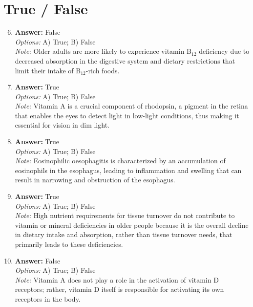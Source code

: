 \documentclass[12pt]{article}
\begin{document}
\section*{True / False}
\begin{enumerate}[label=\arabic*.]
\setcounter{enumi}{5}
\item \textbf{Answer:} False
\\ \textit{Options:} A) True; B) False
\\ \textit{Note:} Older adults are more likely to experience vitamin B$_{12}$ deficiency due to decreased absorption in the digestive system and dietary restrictions that limit their intake of B$_{12}$-rich foods.
\item \textbf{Answer:} True
\\ \textit{Options:} A) True; B) False
\\ \textit{Note:} Vitamin A is a crucial component of rhodopsin, a pigment in the retina that enables the eyes to detect light in low-light conditions, thus making it essential for vision in dim light.
\item \textbf{Answer:} True
\\ \textit{Options:} A) True; B) False
\\ \textit{Note:} Eosinophilic oesophagitis is characterized by an accumulation of eosinophils in the esophagus, leading to inflammation and swelling that can result in narrowing and obstruction of the esophagus.
\item \textbf{Answer:} True
\\ \textit{Options:} A) True; B) False
\\ \textit{Note:} High nutrient requirements for tissue turnover do not contribute to vitamin or mineral deficiencies in older people because it is the overall decline in dietary intake and absorption, rather than tissue turnover needs, that primarily leads to these deficiencies.
\item \textbf{Answer:} False
\\ \textit{Options:} A) True; B) False
\\ \textit{Note:} Vitamin A does not play a role in the activation of vitamin D receptors; rather, vitamin D itself is responsible for activating its own receptors in the body.
\end{enumerate}
\end{document}
